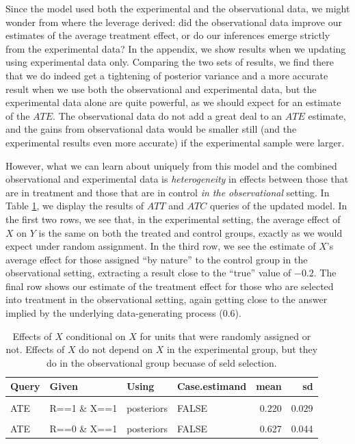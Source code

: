 \documentclass[
  12pt,
]{book}
\begin{document}
Since the model used both the experimental and the observational data, we might wonder from where the leverage derived: did the observational data improve our estimates of the average treatment effect, or do our inferences emerge strictly from the experimental data? In the appendix, we show results when we updating using experimental data only.
Comparing the two sets of results, we find there that we do indeed get a tightening of posterior variance and a more accurate result when we use both the observational and experimental data, but the experimental data alone are quite powerful, as we should expect for an estimate of the \(ATE\). The observational data do not add a great deal to an \(ATE\) estimate, and the gains from observational data would be smaller still (and the experimental results even more accurate) if the experimental sample were larger.

However, what we can learn about uniquely from this model and the combined observational and experimental data is \emph{heterogeneity} in effects between those that are in treatment and those that are in control \emph{in the observational} setting. In Table \ref{tab:combexpobsattatc}, we display the results of \(ATT\) and \(ATC\) queries of the updated model. In the first two rows, we see that, in the experimental setting, the average effect of \(X\) on \(Y\) is the same on both the treated and control groups, exactly as we would expect under random assignment. In the third row, we see the estimate of \(X\)'s average effect for those assigned ``by nature'' to the control group in the observational setting, extracting a result close to the ``true'' value of \(-0.2\). The final row shows our estimate of the treatment effect for those who are selected into treatment in the observational setting, again getting close to the answer implied by the underlying data-generating process (\(0.6\)).

\begin{table}

\caption{\label{tab:combexpobsattatc}Effects of $X$ conditional on $X$ for units that were randomly assigned or not.  Effects of $X$ do not depend on $X$ in the experimental group, but they do in the observational group becuase of seld selection. }
\centering
\begin{tabular}[t]{llllrr}
\toprule
Query & Given & Using & Case.estimand & mean & sd\\
\midrule
\cellcolor{gray!6}{ATE} & \cellcolor{gray!6}{R==1 \& X==0} & \cellcolor{gray!6}{posteriors} & \cellcolor{gray!6}{FALSE} & \cellcolor{gray!6}{0.220} & \cellcolor{gray!6}{0.029}\\
ATE & R==1 \& X==1 & posteriors & FALSE & 0.220 & 0.029\\
\cellcolor{gray!6}{ATE} & \cellcolor{gray!6}{R==0 \& X==0} & \cellcolor{gray!6}{posteriors} & \cellcolor{gray!6}{FALSE} & \cellcolor{gray!6}{-0.159} & \cellcolor{gray!6}{0.025}\\
ATE & R==0 \& X==1 & posteriors & FALSE & 0.627 & 0.044\\
\bottomrule
\end{tabular}
\end{table}
\end{document}
